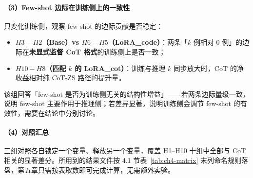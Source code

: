 \paragraph{（3）Few-shot 边际在训练侧上的一致性}
只变化训练侧，观察 few-shot 的边际贡献是否稳定：
\begin{itemize}
    \item \textbf{$H3 - H2$（Base）vs $H6 - H5$（LoRA\_code）}：两条「$k$ 例相对 $0$ 例」的边际在\textbf{未显式监督 CoT 格式}的训练侧上是否一致；
    \item \textbf{$H10 - H8$（匹配 $k$ 的 LoRA\_cot）}：训练与推理 $k$ 同步放大时，CoT 的净收益相对纯 CoT-ZS 路径的提升量。
\end{itemize}
该组回答「few-shot 是否为训练侧无关的结构性增益」——若两条边际量级一致，说明 few-shot 主要作用于推理侧；若差异显著，说明训练侧会调节 few-shot 的有效性，需要在结论中分别讨论。

\paragraph{（4）对照汇总}
三组对照各自锁定一个变量、释放另一个变量，覆盖 H1--H10 十组中全部与 CoT 相关的显著差分。所用到的结果文件按 4.1 节表~\ref{tab:ch4-matrix} 末列命名规则落盘，第五章只需按表取数即可完成计算，无需额外实验。
